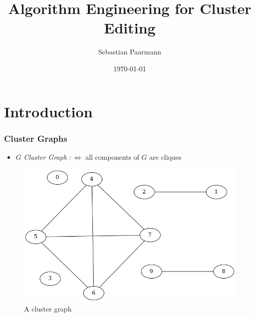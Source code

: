 \documentclass{beamer}
\title{Algorithm Engineering for Cluster Editing}
\author{Sebastian Paarmann}
\date{\today}
\begin{document}
\begin{frame}
	\titlepage
\end{frame}


\section{Introduction}

\begin{frame}
	\frametitle{Cluster Graphs}
	\begin{itemize}
		\item $G$ \emph{Cluster Graph} $:\Leftrightarrow$ all components of $G$ are cliques
	\end{itemize}

	\begin{figure}[h]
		\centering
		\includegraphics[width=0.7\linewidth]{exact001-output}

		\caption{A cluster graph}
	\end{figure}
\end{frame}
\end{document}
